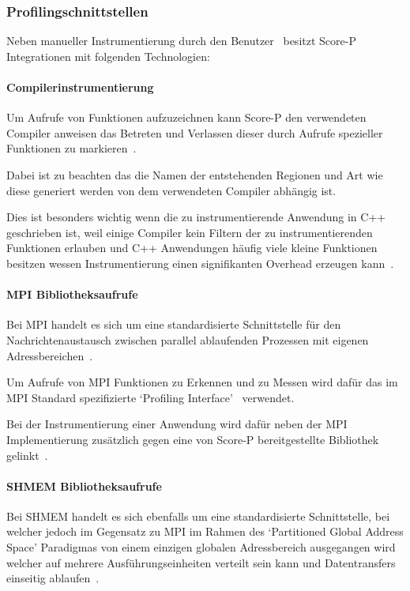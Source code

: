 \documentclass[german,proseminar,hyperref,utf8]{zihpub}
\begin{document}
    \subsubsection{Profilingschnittstellen}
    Neben manueller Instrumentierung durch den Benutzer~
    besitzt Score-P Integrationen mit folgenden Technologien:

    \paragraph{Compilerinstrumentierung}
    Um Aufrufe von Funktionen aufzuzeichnen kann Score-P den verwendeten Compiler
    anweisen das Betreten und Verlassen dieser durch Aufrufe spezieller Funktionen
    zu markieren~.

    Dabei ist zu beachten das die Namen der entstehenden Regionen und Art wie diese generiert
    werden von dem verwendeten Compiler abhängig ist.

    Dies ist besonders wichtig wenn die zu instrumentierende Anwendung in C++ geschrieben ist,
    weil einige Compiler kein Filtern der zu instrumentierenden Funktionen erlauben und C++
    Anwendungen häufig viele kleine Funktionen besitzen wessen Instrumentierung einen signifikanten
    Overhead erzeugen kann~.

    \paragraph{MPI Bibliotheksaufrufe}
    Bei MPI handelt es sich um eine standardisierte Schnittstelle für den Nachrichtenaustausch
    zwischen parallel ablaufenden Prozessen mit eigenen Adressbereichen~.

    Um Aufrufe von MPI Funktionen zu Erkennen und zu Messen wird dafür das im MPI Standard
    spezifizierte `Profiling Interface'~ verwendet.

    Bei der Instrumentierung einer Anwendung wird dafür neben der MPI Implementierung zusätzlich
    gegen eine von Score-P bereitgestellte Bibliothek gelinkt~.

    \paragraph{SHMEM Bibliotheksaufrufe}
    Bei SHMEM handelt es sich ebenfalls um eine standardisierte Schnittstelle, bei welcher jedoch
    im Gegensatz zu MPI im Rahmen des `Partitioned Global Address Space' Paradigmas von einem
    einzigen globalen Adressbereich ausgegangen wird welcher auf mehrere Ausführungseinheiten
    verteilt sein kann und Datentransfers einseitig ablaufen~.
\end{document}
